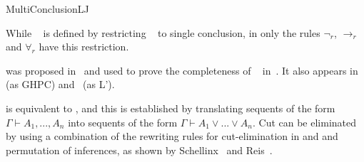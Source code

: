 \begin{entry}{MultiConclusionLJ}
\begin{clarifications}
While \LJ~ is defined by restricting \LK~ to
single conclusion, in \LJmc only the rules $\neg_r$, $\rightarrow_r$ and
$\forall_r$ have this restriction.
\end{clarifications}

\begin{history}
\LJmc was proposed in~\cite{Maehara1954} and used to prove the completeness of
\LJ~ in~\cite{takeuti87}. 
It also appears in~\cite{dragalin88} (as GHPC) and~\cite{dummett77} (as L').
\end{history}

\begin{technicalities}
\LJmc is equivalent to \LJ, and this is established by translating
sequents of the form $\Gamma \vdash A_1, ..., A_n$ into 
sequents of the form $\Gamma \vdash A_1 \vee ... \vee A_n$. 
Cut can be eliminated by using a combination of the rewriting
rules for cut-elimination in \LJ and \LK and permutation of inferences, as shown
by Schellinx~\cite{Schellinx91} and Reis~\cite{GisellePhD}.
\end{technicalities}

\end{entry}
